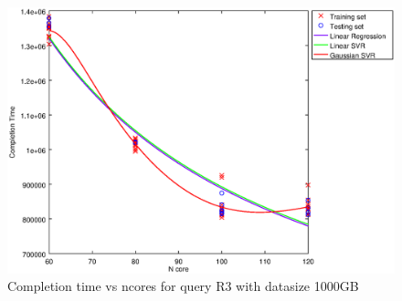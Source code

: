 
\begin {figure}[hbtp]
\centering
\includegraphics[width=\textwidth]{output/R3_1000_ONLY_1_OVER_NCORES/plot_R3_1000_bestmodels.eps}
\caption{Completion time vs ncores for query R3 with datasize 1000GB}
\label{fig:all_nonlinear_R3_1000}
\end {figure}
